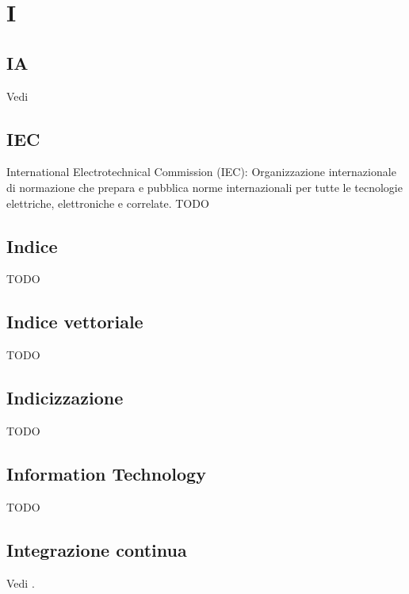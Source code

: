 \section{I}

\vspace{2em}
\subsection*{IA}
\par Vedi 

\vspace{2em}
\subsection*{IEC}
International Electrotechnical Commission (IEC): Organizzazione internazionale di normazione che prepara e pubblica norme internazionali per tutte le tecnologie elettriche, elettroniche e correlate.
TODO

\vspace{2em}
\subsection*{Indice}
TODO

\vspace{2em}
\subsection*{Indice vettoriale}
TODO

\vspace{2em}
\subsection*{Indicizzazione}
TODO

\vspace{2em}
\subsection*{Information Technology}
TODO

\vspace{2em}
\subsection*{Integrazione continua}
\par Vedi .

\vspace{2em}
